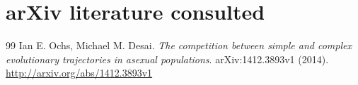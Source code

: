 \documentclass[11pt,a4paper]{article}
\begin{document}
\section{arXiv literature consulted}
\begin{thebibliography}{99}
 Ian E. Ochs, Michael M. Desai. \emph{The competition between simple and complex evolutionary trajectories in asexual populations}. arXiv:1412.3893v1 (2014). \url{http://arxiv.org/abs/1412.3893v1}
\end{thebibliography}
\end{document}
